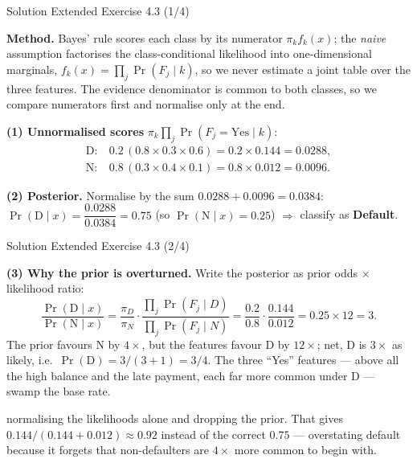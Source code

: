 \documentclass[aspectratio=169,11pt]{beamer}
\begin{document}
\begin{frame}{Solution \textemdash{} Extended Exercise 4.3 (1/4)}
\begin{solutionbox}
\textbf{Method.} Bayes' rule scores each class by its numerator
$\pi_k f_k(x)$; the \emph{naive} assumption factorises the
class-conditional likelihood into one-dimensional marginals,
$f_k(x)=\prod_j\Pr(F_j\mid k)$, so we never estimate a joint table over
the three features. The evidence denominator is common to both classes,
so we compare numerators first and normalise only at the end.

\vspace{1mm}
\textbf{(1) Unnormalised scores} $\pi_k\prod_j\Pr(F_j=\text{Yes}\mid k)$:
\[
\begin{aligned}
  \text{D}:&\ 0.2\,(0.8\times 0.3\times 0.6)=0.2\times 0.144=0.0288,\\
  \text{N}:&\ 0.8\,(0.3\times 0.4\times 0.1)=0.8\times 0.012=0.0096.
\end{aligned}
\]

\textbf{(2) Posterior.} Normalise by the sum $0.0288+0.0096=0.0384$:
$\Pr(\text{D}\mid x)=\dfrac{0.0288}{0.0384}=0.75$
(so $\Pr(\text{N}\mid x)=0.25$) $\Rightarrow$ classify as \textbf{Default}.
\end{solutionbox}
\end{frame}

\begin{frame}{Solution \textemdash{} Extended Exercise 4.3 (2/4)}
\begin{solutionbox}
\textbf{(3) Why the prior is overturned.}
Write the posterior as prior odds $\times$ likelihood ratio:
\[
  \frac{\Pr(\text{D}\mid x)}{\Pr(\text{N}\mid x)}
  =\frac{\pi_D}{\pi_N}\cdot\frac{\prod_j\Pr(F_j\mid D)}{\prod_j\Pr(F_j\mid N)}
  =\frac{0.2}{0.8}\cdot\frac{0.144}{0.012}=0.25\times 12=3 .
\]
The prior favours N by $4\times$, but the features favour D by $12\times$;
net, D is $3\times$ as likely, i.e.\ $\Pr(\text{D})=3/(3+1)=3/4$. The
three ``Yes'' features --- above all the high balance and the late
payment, each far more common under D --- swamp the base rate.
\end{solutionbox}
\begin{mistake}
normalising the likelihoods alone and dropping the
prior. That gives $0.144/(0.144+0.012)\approx 0.92$ instead of the
correct $0.75$ --- overstating default because it forgets that
non-defaulters are $4\times$ more common to begin with.
\end{mistake}
\end{frame}
\end{document}
